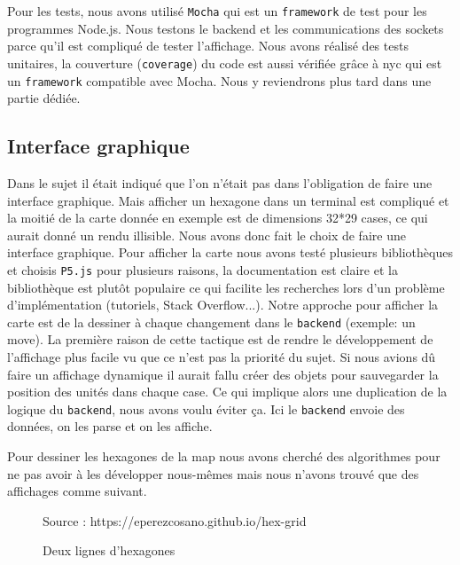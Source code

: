 Pour les tests, nous avons utilisé {\tt Mocha} qui est un {\tt framework} de test pour les programmes Node.js.
Nous testons le backend et les communications des sockets parce qu'il est compliqué de tester l'affichage.
Nous avons réalisé des tests unitaires, la couverture ({\tt coverage}) du code est aussi vérifiée grâce à nyc qui est un {\tt framework} compatible avec Mocha.
Nous y reviendrons plus tard dans une partie dédiée.

\subsection{Interface graphique}

Dans le sujet il était indiqué que l'on n'était pas dans l'obligation de faire une interface graphique. Mais afficher un hexagone dans un terminal est compliqué et la moitié de la carte donnée en exemple est de dimensions 32*29 cases, ce qui aurait donné un rendu illisible. Nous avons donc fait le choix de faire une interface graphique. Pour afficher la carte nous avons testé plusieurs bibliothèques et choisis \lstinline{P5.js} pour plusieurs raisons, la documentation est claire et la bibliothèque est plutôt populaire ce qui facilite les recherches lors d'un problème d'implémentation (tutoriels, Stack Overflow...).
Notre approche pour afficher la carte est de la dessiner à chaque changement dans le \lstinline{backend} (exemple: un move). La première raison de cette tactique est de rendre le développement de l'affichage plus facile vu que ce n'est pas la priorité du sujet. Si nous avions dû faire un affichage dynamique il aurait fallu créer des objets pour sauvegarder la position des unités dans chaque case. Ce qui implique alors une duplication de la logique du \lstinline{backend}, nous avons voulu éviter ça. Ici le \lstinline{backend} envoie des données, on les parse et on les affiche.

Pour dessiner les hexagones de la map nous avons cherché des algorithmes pour ne pas avoir à les développer nous-mêmes mais nous n'avons trouvé que des affichages comme suivant.

\begin{figure}[H]
    \centering
    \def\stackalignment{r}
    {\scriptsize%
        Source : https://eperezcosano.github.io/hex-grid}
    \caption{Deux lignes d'hexagones}
    \label{fig:hexmap_exemple}
\end{figure}

